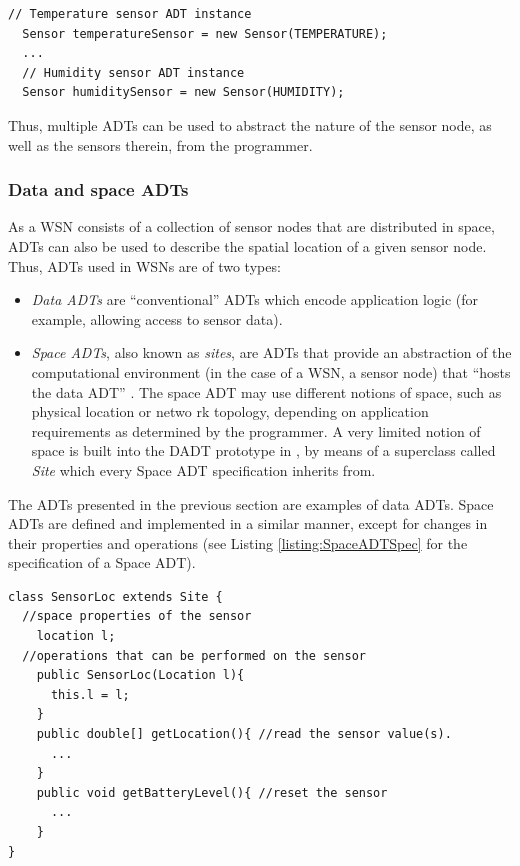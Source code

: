 \begin{lstlisting}[frame=trbl, basewidth={0.55em, 0.6em}, captionpos=b,
basicstyle=\ttfamily\footnotesize, breaklines, caption = Sensor ADT instances, label =
listing:ADTInstances]
  // Temperature sensor ADT instance
  Sensor temperatureSensor = new Sensor(TEMPERATURE);
  ...
  // Humidity sensor ADT instance  
  Sensor humiditySensor = new Sensor(HUMIDITY);
\end{lstlisting}

Thus, multiple ADTs can be used to abstract the nature of the
sensor node, as well as the sensors therein, from the programmer. 

\subsubsection{Data and space ADTs} \label{subsubsec:DataAndSpaceADTs}

As a WSN consists of a collection of sensor nodes that are distributed in
space, ADTs can also be used to describe the spatial location of a given
sensor node. Thus, ADTs used in WSNs are of two types:

\begin{itemize}
  \item \emph{Data ADTs} are ``conventional'' ADTs which encode
  application logic (for example, allowing access to sensor data).
  \item \emph{Space ADTs}, also known as \emph{sites}, are ADTs that provide an
  abstraction of the computational environment (in the case of a WSN, a sensor
  node) that ``hosts the data ADT'' \cite{migliavacca_DADT:2006}. The space ADT
  may use different notions of space, such as physical location or netwo
 rk topology, depending on application requirements as determined by the
 programmer. A very limited notion of space is built into the DADT prototype in
 \cite{migliavacca_DADT:2006}, by means of a superclass called \emph{Site} which
 every Space ADT specification inherits from.
\end{itemize}

The ADTs presented in the previous section are examples of data ADTs. Space
ADTs are defined and implemented in a similar manner, except for changes in
their properties and operations (see Listing \ref{listing:SpaceADTSpec} for the
specification of a Space ADT).  
 
 \begin{lstlisting}[frame=trbl, basewidth={0.55em, 0.6em}, captionpos=b, basicstyle=\ttfamily\footnotesize, breaklines, caption = Sensor Space ADT specification (reproduced from \cite{migliavacca_DADT:2006}), label=listing:SpaceADTSpec]
class SensorLoc extends Site {
  //space properties of the sensor 
	location l;
  //operations that can be performed on the sensor
	public SensorLoc(Location l){
	  this.l = l;
	}
	public double[] getLocation(){ //read the sensor value(s).
	  ...
	}
	public void getBatteryLevel(){ //reset the sensor
	  ...
	}
}
\end{lstlisting}
 
